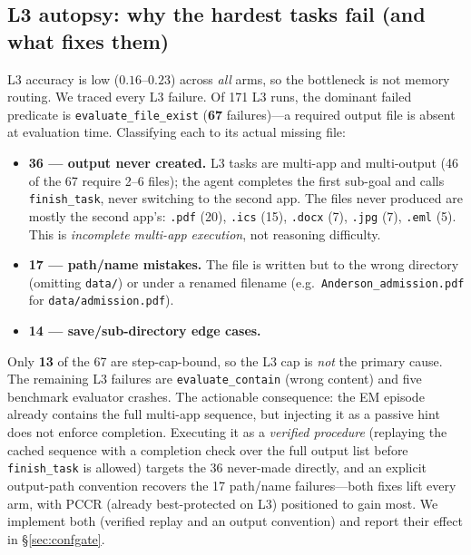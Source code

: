 \documentclass[10pt,twocolumn]{article}
\newcommand{\code}[1]{\texttt{\small #1}}
\begin{document}
\subsection{L3 autopsy: why the hardest tasks fail (and what fixes them)}
\label{sec:t1l3}
L3 accuracy is low ($0.16$--$0.23$) across \emph{all} arms, so the bottleneck is not
memory routing. We traced every L3 failure. Of 171 L3 runs, the dominant failed predicate
is \code{evaluate\_file\_exist} (\textbf{67} failures)---a required output file is absent
at evaluation time. Classifying each to its actual missing file:
\begin{itemize}\itemsep1pt
\item \textbf{36 --- output never created.} L3 tasks are multi-app and multi-output (46 of
the 67 require 2--6 files); the agent completes the first sub-goal and calls
\code{finish\_task}, never switching to the second app. The files never produced are
mostly the second app's: \code{.pdf} (20), \code{.ics} (15), \code{.docx} (7),
\code{.jpg} (7), \code{.eml} (5). This is \emph{incomplete multi-app execution}, not
reasoning difficulty.
\item \textbf{17 --- path/name mistakes.} The file is written but to the wrong directory
(omitting \code{data/}) or under a renamed filename (e.g.\ \code{Anderson\_admission.pdf}
for \code{data/admission.pdf}).
\item \textbf{14 --- save/sub-directory edge cases.}
\end{itemize}
Only \textbf{13} of the 67 are step-cap-bound, so the L3 cap is \emph{not} the primary
cause. The remaining L3 failures are \code{evaluate\_contain} (wrong content) and five
benchmark evaluator crashes. The actionable consequence: the EM episode already contains
the full multi-app sequence, but injecting it as a passive hint does not enforce
completion. Executing it as a \emph{verified procedure} (replaying the cached sequence
with a completion check over the full output list before \code{finish\_task} is allowed)
targets the 36 never-made directly, and an explicit output-path convention recovers the
17 path/name failures---both fixes lift every arm, with PCCR (already best-protected on
L3) positioned to gain most. We implement both (verified replay and an output convention)
and report their effect in \S\ref{sec:confgate}.
\end{document}
